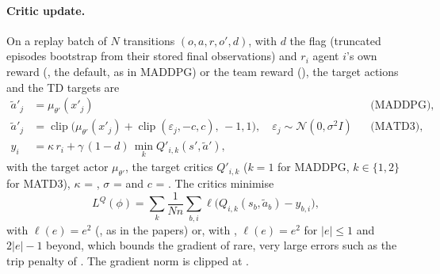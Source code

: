 \paragraph{Critic update.} On a replay batch of $N$ transitions
$(o, a, r, o', d)$, with $d$ the  flag (truncated episodes
bootstrap from their stored final observations) and $r_i$ agent $i$'s own
reward (, the default, as in MADDPG) or the team
reward (), the target actions and the TD targets are
\begin{align}
  \tilde a'_j &= \mu_{\theta'}(x'_j) &&\text{(MADDPG)}, \nonumber\\
  \tilde a'_j &= \operatorname{clip}\bigl(\mu_{\theta'}(x'_j)
      + \operatorname{clip}(\varepsilon_j, -c, c),\, -1, 1\bigr),
      \quad \varepsilon_j \sim \mathcal{N}(0, \sigma^2 I) &&\text{(MATD3)},
      \label{eq:marl-target-actions}\\
  y_i &= \kappa\, r_i + \gamma\,(1 - d)\, \min_{k} Q'_{i,k}(s', \tilde a'), \nonumber
\end{align}
with the target actor $\mu_{\theta'}$, the target critics $Q'_{i,k}$ ($k = 1$
for MADDPG, $k \in \{1, 2\}$ for MATD3), $\kappa$ = ,
$\sigma$ =  and $c$ = . The
critics minimise
\begin{equation}
  L^{Q}(\phi) = \sum_k \frac{1}{N n} \sum_{b, i}
      \ell\bigl(Q_{i,k}(s_b, \tilde a_b) - y_{b,i}\bigr),
  \label{eq:marl-ddpg-critic}
\end{equation}
with $\ell(e) = e^2$ (, as in the papers) or, with
, $\ell(e) = e^2$ for $|e| \le 1$ and $2|e| - 1$
beyond, which bounds the gradient of rare, very large errors such as the trip
penalty of . The gradient norm is clipped at
.

